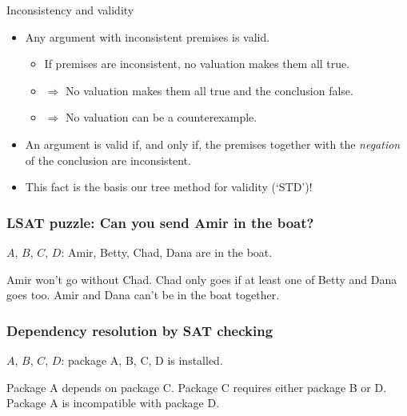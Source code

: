 \begin{frame}{Inconsistency and validity}
  \begin{itemize}[<+->]
    \item Any argument with inconsistent premises is valid.
    \begin{itemize}[<+->]
      \item If premises are inconsistent, no valuation makes
      them all true.
      \item[] $\Rightarrow$ No valuation makes them all true and the conclusion false.
      \item[] $\Rightarrow$ No valuation can be a counterexample.
    \end{itemize}
    \item An argument is valid if, and only if, the premises together
    with the \emph{negation} of the conclusion are inconsistent.
    
    \item This fact is the basis our tree method for validity (`STD')!
  \end{itemize}
  
\end{frame}

\begin{frame}
\frametitle{LSAT puzzle: Can you send Amir in the boat?}

$A$, $B$, $C$, $D$: Amir, Betty, Chad, Dana are in the boat.

Amir won't go without Chad. 
Chad only goes if at least one of Betty and Dana goes too.
%
Amir and Dana can't be in the boat together.
\end{frame}

\begin{frame}
\frametitle{Dependency resolution by SAT checking}

$A$, $B$, $C$, $D$: package A, B, C, D is installed.

Package A depends on package C.
%
Package C requires either package B or D.
%
Package A is incompatible with package D.
\end{frame}

